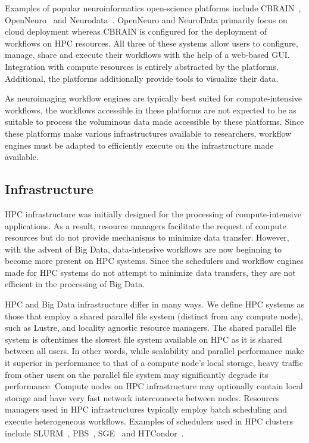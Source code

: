             Examples of popular neuroinformatics open-science platforms include
            CBRAIN~\cite{10.3389/fninf.2014.00054},
            OpenNeuro~\cite{gorgolewski2017openneuro} and
            Neurodata~\cite{burns2018community}. OpenNeuro and NeuroData
            primarily focus on cloud deployment whereas CBRAIN is configured
            for the deployment of workflows on HPC resources. All three of these
            systems allow users to configure, manage, share and execute their
            workflows with the help of a web-based GUI. Integration with compute
            resources is entirely abstracted by the platforms. Additional, the platforms
            additionally provide tools to visualize their data.

            As neuroimaging workflow engines are typically best suited for
            compute-intensive workflows, the workflows accessible in these
            platforms are not expected to be as suitable to process the voluminous data
            made accessible by these platforms. Since these platforms
            make various infrastructures available to researchers, workflow
            engines must be adapted to efficiently execute on the infrastructure
            made available.
            
        \subsection{Infrastructure}\label{infrastructure} HPC infrastructure was
            initially designed for the processing of compute-intensive
            applications. As a result, resource managers facilitate the request of compute
            resources but do not provide mechanisms to minimize data transfer. However, with the advent of Big Data, data-intensive
            workflows are now beginning to become more present on HPC systems.
            Since the schedulers and workflow engines made for HPC systems do not
            attempt to minimize data transfers, they are not efficient in the processing of Big Data.

            HPC and Big Data infrastructure differ in many ways. We define HPC
            systems as those that employ a shared parallel file system (distinct
            from any compute node), such as Lustre, and locality agnostic resource managers.
            The shared parallel file system is oftentimes the slowest file system available
            on HPC as it is shared between all users. In other words, while scalability and parallel performance
            make it superior in performance to that of a compute node's local storage, heavy traffic from other users on
            the parallel file system may significantly degrade its performance. 
            Compute nodes on HPC infrastructure may optionally contain local storage
            and have very fast network interconnects between nodes. Resources managers used in HPC infrastructures typically
            employ batch scheduling and execute heterogeneous workflows. Examples
            of schedulers used in HPC clusters include
            SLURM~\cite{yoo2003slurm}, PBS~\cite{10.1007/3-540-60153-8_34},
            SGE~\cite{SGE} and HTCondor~\cite{htcondor}.

